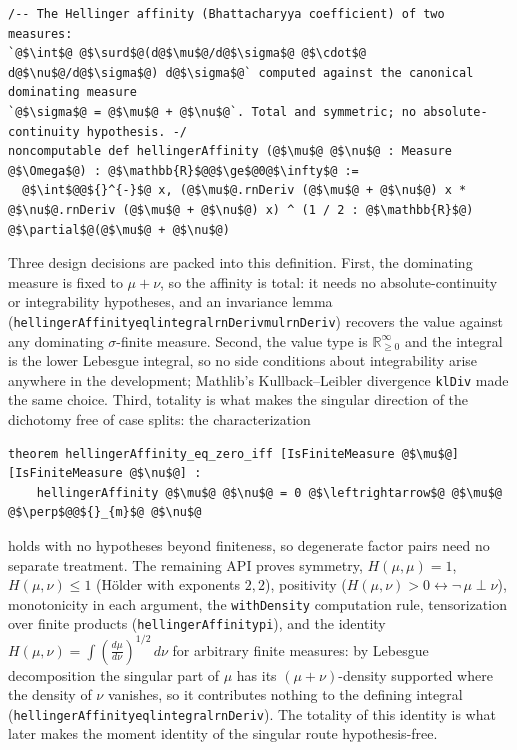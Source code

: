 \documentclass[a4paper,UKenglish,autoref,thm-restate]{lipics-v2021}
\newcommand{\ennreal}{\ensuremath{\mathbb{R}_{\ge 0}^{\infty}}}
\newcommand{\leanid}[1]{{\def\_{\textunderscore\allowbreak}\texttt{#1}}}
\begin{document}
\begin{lstlisting}
/-- The Hellinger affinity (Bhattacharyya coefficient) of two measures:
`@$\int$@ @$\surd$@(d@$\mu$@/d@$\sigma$@ @$\cdot$@ d@$\nu$@/d@$\sigma$@) d@$\sigma$@` computed against the canonical dominating measure
`@$\sigma$@ = @$\mu$@ + @$\nu$@`. Total and symmetric; no absolute-continuity hypothesis. -/
noncomputable def hellingerAffinity (@$\mu$@ @$\nu$@ : Measure @$\Omega$@) : @$\mathbb{R}$@@$\ge$@0@$\infty$@ :=
  @$\int$@@${}^{-}$@ x, (@$\mu$@.rnDeriv (@$\mu$@ + @$\nu$@) x * @$\nu$@.rnDeriv (@$\mu$@ + @$\nu$@) x) ^ (1 / 2 : @$\mathbb{R}$@) @$\partial$@(@$\mu$@ + @$\nu$@)
\end{lstlisting}

Three design decisions are packed into this definition. First, the dominating
measure is fixed to $\mu + \nu$, so the affinity is total: it needs no
absolute-continuity or integrability hypotheses, and an invariance lemma
(\leanid{hellingerAffinity\_eq\_lintegral\_rnDeriv\_mul\_rnDeriv}) recovers the
value against any dominating $\sigma$-finite measure. Second, the value type
is \ennreal{} and the integral is the lower Lebesgue integral, so no side
conditions about integrability arise anywhere in the development; Mathlib's
Kullback--Leibler divergence \leanid{klDiv} made the same choice. Third,
totality is what makes the singular direction of the dichotomy free of case
splits: the characterization
\begin{lstlisting}
theorem hellingerAffinity_eq_zero_iff [IsFiniteMeasure @$\mu$@] [IsFiniteMeasure @$\nu$@] :
    hellingerAffinity @$\mu$@ @$\nu$@ = 0 @$\leftrightarrow$@ @$\mu$@ @$\perp$@@${}_{m}$@ @$\nu$@
\end{lstlisting}
holds with no hypotheses beyond finiteness, so degenerate factor pairs need no
separate treatment. The remaining API proves symmetry, $H(\mu,\mu) = 1$,
$H(\mu,\nu) \le 1$ (H\"older with exponents $2, 2$), positivity
($H(\mu,\nu) > 0 \leftrightarrow \lnot\, \mu \perp \nu$), monotonicity in
each argument, the \leanid{withDensity} computation rule, tensorization over
finite products (\leanid{hellingerAffinity\_pi}), and the identity
$H(\mu,\nu) = \int (\tfrac{d\mu}{d\nu})^{1/2}\, d\nu$ for arbitrary finite
measures: by Lebesgue decomposition the singular part of $\mu$ has its
$(\mu+\nu)$-density supported where the density of $\nu$ vanishes, so it
contributes nothing to the defining integral
(\leanid{hellingerAffinity\_eq\_lintegral\_rnDeriv}). The totality of this
identity is what later makes the moment identity of the singular route
hypothesis-free.
\end{document}
